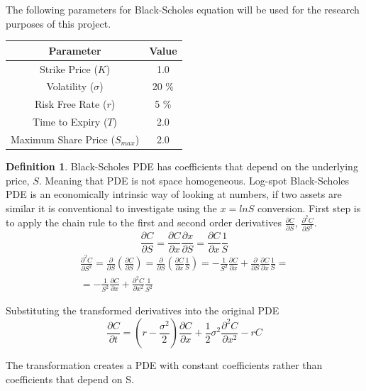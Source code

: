 \documentclass[12pt, oneside]{book}
\theoremstyle{plain}
\theoremstyle{definition}
\newtheorem{definition}[theorem]{Definition}
\begin{document}
The following parameters for Black-Scholes equation will be used for the research purposes of this project.
\begin{table}[h!]
\centering
 \begin{tabular}{||c c||} 
 \hline
 Parameter & Value\\ [0.5ex]
 \hline\hline
 Strike Price ($K$) & 1.0\\ 
 Volatility ($\sigma$) & 20 \% \\
 Risk Free Rate ($r$) & 5 \% \\
 Time to Expiry ($T$) & 2.0\\
 Maximum Share Price ($S_{max}$) & 2.0\\ [1ex] 
 \hline
 \end{tabular}
\end{table}

\begin{definition} 
Black-Scholes PDE has coefficients that depend on the underlying price, $S$. Meaning that PDE is not space homogeneous. Log-spot Black-Scholes PDE is an economically intrinsic way of looking at numbers, if two assets are similar it is conventional to investigate using the $x = ln S$ conversion. First step is to apply the chain rule to the first and second order derivatives  $\frac{\partial C}{\partial S} $, $\frac{\partial^2 C}{\partial S^2}$.
\begin{equation}
\frac{\partial C}{\partial S} = \frac{\partial C}{\partial x} \frac{\partial x}{\partial S} = \frac{\partial C}{\partial x} \frac{1}{S}
\end{equation}
\begin{eqnarray}
\frac{\partial^2 C}{\partial S^2} = \frac{\partial }{\partial S} (\frac{\partial C}{\partial S}) = \frac{\partial }{\partial S} (\frac{\partial C}{\partial x} \frac{1}{S}) = -\frac{1}{S^2} \frac{\partial C}{\partial x} + \frac{\partial }{\partial S} \frac{\partial C}{\partial x} \frac{1}{S} = \\
 = -\frac{1}{S^2} \frac{\partial C}{\partial x} + \frac{\partial^2 C}{\partial x^2} \frac{1}{S^2} 
\end{eqnarray}

Substituting the transformed derivatives into the original PDE 
\begin{equation}
\frac{\partial C}{\partial t} = (r - \frac{\sigma^2}{2})\frac{\partial C}{\partial x}+\frac{1}{2} \sigma^2 \frac{\partial^2 C}{\partial x^2} - rC
\end{equation}

The transformation creates a PDE with constant coefficients rather than coefficients that depend on S. 

\end{definition}
\end{document}
